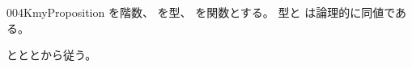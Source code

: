 \documentclass[index]{subfiles}
\begin{document}
\begin{myBlock}{004K}{myProposition}
  を階数、
  を型、
  を関数とする。
  型と
  は論理的に同値である。
\end{myBlock}
\begin{myProof}
  とととから従う。
\end{myProof}
\end{document}
